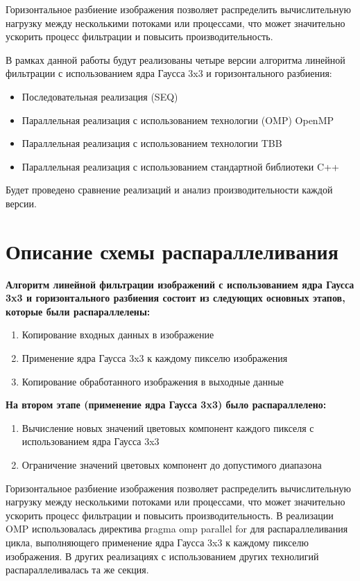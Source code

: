 \documentclass{report}
\begin{document}
\par Горизонтальное разбиение изображения позволяет распределить вычислительную нагрузку между несколькими потоками или процессами, что может значительно ускорить процесс фильтрации и повысить производительность.

\par В рамках данной работы будут реализованы четыре версии алгоритма линейной фильтрации с использованием ядра Гаусса 3x3 и горизонтального разбиения:
\begin{itemize}
\item Последовательная реализация (SEQ)
\item Параллельная реализация с использованием технологии (OMP) OpenMP
\item Параллельная реализация с использованием технологии TBB
\item Параллельная реализация с использованием стандартной библиотеки C++
\end{itemize}
Будет проведено сравнение реализаций и анализ производительности каждой версии.

\newpage

\section* {Описание схемы распараллеливания}
\par \textbf{Алгоритм линейной фильтрации изображений с использованием ядра Гаусса 3x3 и горизонтального разбиения состоит из следующих основных этапов, которые были распараллелены:}
\begin{enumerate}
\item Копирование входных данных в изображение
\item Применение ядра Гаусса 3x3 к каждому пикселю изображения
\item Копирование обработанного изображения в выходные данные
\end{enumerate}
\vspace{2em}
\par \textbf{На втором этапе (применение ядра Гаусса 3x3) было распараллелено:}
\begin{enumerate}
\item Вычисление новых значений цветовых компонент каждого пикселя с использованием ядра Гаусса 3x3
\item Ограничение значений цветовых компонент до допустимого диапазона
\end{enumerate}
\vspace{1em}
\par Горизонтальное разбиение изображения позволяет распределить вычислительную нагрузку между несколькими потоками или процессами, что может значительно ускорить процесс фильтрации и повысить производительность. В реализации OMP использовалась директива \texttt pragma omp parallel for для распараллеливания цикла, выполняющего применение ядра Гаусса 3x3 к каждому пикселю изображения. В других реализациях с использованием других технолигий распараллеливалась та же секция.
\end{document}
